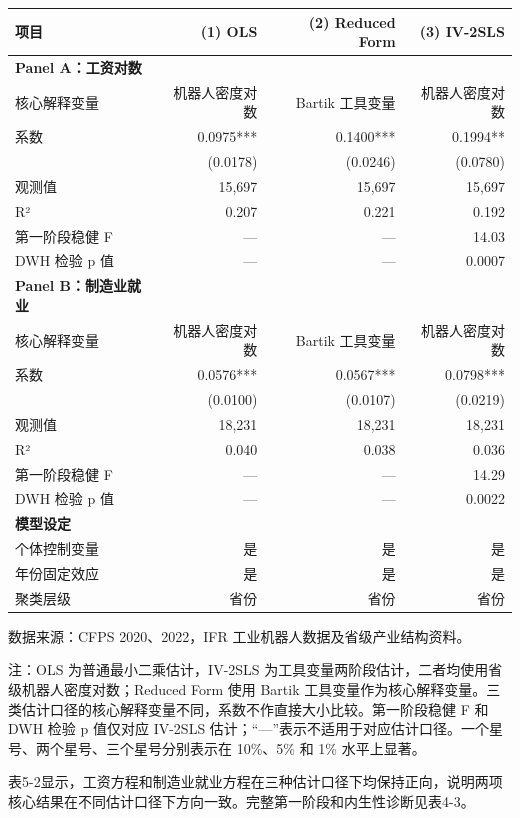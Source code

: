 \documentclass[UTF8, zihao=-4, a4paper, openany, fontset=none]{ctexrep}
\newcounter{none}
\numberwithin{equation}{chapter}
\begin{document}
{\def\LTcaptype{none} %
\begin{longtable}[]{@{}lrrr@{}}
\toprule\noalign{}
项目 & (1) OLS & (2) Reduced Form & (3) IV-2SLS \\
\midrule\noalign{}
\endhead
\bottomrule\noalign{}
\endlastfoot
\textbf{Panel A：工资对数} & & & \\
核心解释变量 & 机器人密度对数 & Bartik 工具变量 & 机器人密度对数 \\
系数 & 0.0975*** & 0.1400*** & 0.1994** \\
& (0.0178) & (0.0246) & (0.0780) \\
观测值 & 15,697 & 15,697 & 15,697 \\
R² & 0.207 & 0.221 & 0.192 \\
第一阶段稳健 F & --- & --- & 14.03 \\
DWH 检验 p 值 & --- & --- & 0.0007 \\
\textbf{Panel B：制造业就业} & & & \\
核心解释变量 & 机器人密度对数 & Bartik 工具变量 & 机器人密度对数 \\
系数 & 0.0576*** & 0.0567*** & 0.0798*** \\
& (0.0100) & (0.0107) & (0.0219) \\
观测值 & 18,231 & 18,231 & 18,231 \\
R² & 0.040 & 0.038 & 0.036 \\
第一阶段稳健 F & --- & --- & 14.29 \\
DWH 检验 p 值 & --- & --- & 0.0022 \\
\textbf{模型设定} & & & \\
个体控制变量 & 是 & 是 & 是 \\
年份固定效应 & 是 & 是 & 是 \\
聚类层级 & 省份 & 省份 & 省份 \\
\end{longtable}
}

数据来源：CFPS 2020、2022，IFR 工业机器人数据及省级产业结构资料。

注：OLS 为普通最小二乘估计，IV-2SLS 为工具变量两阶段估计，二者均使用省级机器人密度对数；Reduced Form 使用 Bartik 工具变量作为核心解释变量。三类估计口径的核心解释变量不同，系数不作直接大小比较。第一阶段稳健 F 和 DWH 检验 p 值仅对应 IV-2SLS 估计；``---''表示不适用于对应估计口径。一个星号、两个星号、三个星号分别表示在 10\%、5\% 和 1\% 水平上显著。

表5-2显示，工资方程和制造业就业方程在三种估计口径下均保持正向，说明两项核心结果在不同估计口径下方向一致。完整第一阶段和内生性诊断见表4-3。
\end{document}
